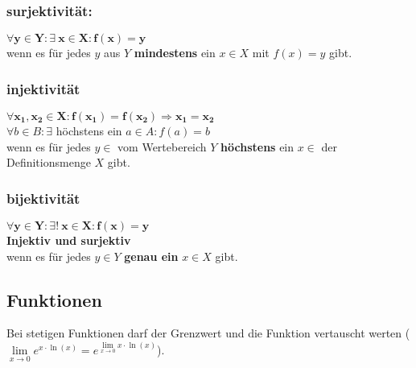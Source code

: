 
\subsubsection{surjektivität:}\label{subs:surjektivitaet}
$\bm{\forall y \in Y : \exists \  x \in X:f(x)=y}$\\
wenn es für jedes $y$ aus $Y$ \textbf{mindestens} ein $x \in X$ mit $f(x) = y$ gibt.\\

\subsubsection{injektivität}\label{subs:injektivitaet}
$\bm{\forall x_1,x_2 \in X:f(x_1)=f(x_2) \Rightarrow x_1=x_2}$\\
$\forall b \in B: \exists$ höchstens ein $a \in A :f(a)=b$\\
wenn es für jedes $y \in $ vom Wertebereich $Y$ \textbf{höchstens} ein $x \in$ der Definitionsmenge $X$ gibt.\\

\subsubsection{bijektivität}\label{subs:bijektivitaet}  
$\bm{\forall y \in Y : \exists ! \  x \in X:f(x)=y}$\\
\textbf{Injektiv und surjektiv}\\
wenn es für jedes $y\in Y$  \textbf{genau ein} $x \in X$ gibt.\\

\subsection{Funktionen}

Bei stetigen Funktionen darf der Grenzwert und die Funktion vertauscht werten ($\lim\limits_{x\to 0 }e^{x\cdot \ln (x)}=e^{\lim\limits_{x\to 0 }x\cdot \ln(x)}$).